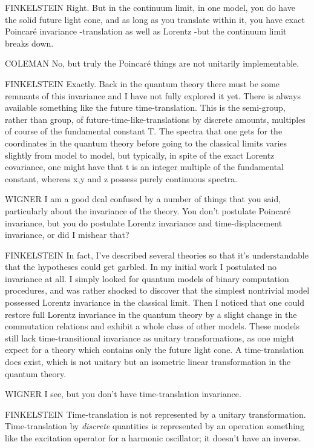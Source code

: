FINKELSTEIN Right. But in the continuum limit, in one model, you do have the
solid future light cone, and as long as you translate within it, you have exact
Poincar\'e invariance -translation as well as Lorentz -but the continuum limit
breaks down.

COLEMAN No, but truly the Poincar\'e things are not unitarily implementable.

FINKELSTEIN Exactly. Back in the quantum theory there must be some remnants of
this invariance and I have not fully explored it yet. There is always available
something like the future time-translation. This is the semi-group, rather than
group, of future-time-like-translations by discrete amounts, multiples of course
of the fundamental constant T. The spectra that one gets for the coordinates in
the quantum theory before going to the classical limits varies slightly from
model to model, but typically, in spite of the exact Lorentz covariance, one
might have that t is an integer multiple of the fundamental constant, whereas x,y
and z possess purely continuous spectra.

WIGNER I am a good deal confused by a number of things that you said,
particularly about the invariance of the theory. You don't postulate Poincar\'e
invariance, but you do postulate Lorentz invariance and time-displacement
invariance, or did I mishear that?

FINKELSTEIN In fact, I've described several theories so that it's understandable
that the hypotheses could get garbled. In my initial work I postulated no
invariance at all. I simply looked for quantum models of binary computation
procedures, and was rather shocked to discover that the simplest non­trivial
model possessed Lorentz invariance in the classical limit. Then I noticed that
one could restore full Lorentz invariance in the quantum theory by a slight
change in the commutation relations and exhibit a whole class of other models.
These models still lack time-transitional invariance as unitary transformations,
as one might expect for a theory which contains only the future light cone. A
time-translation does exist, which is not unitary but an isometric linear
transformation in the quantum theory.

WIGNER I see, but you don't have time-translation invariance.

FINKELSTEIN Time-translation is not represented by a unitary transformation.
Time-translation by \emph{discrete} quantities is represented by an operation
something like the excitation operator for a harmonic oscillator; it doesn't have
an inverse.

